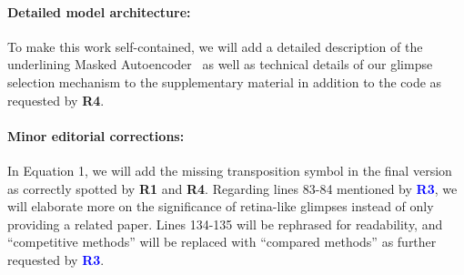 \documentclass{article}
\newcommand{\Rone}{{\textbf{\textcolor{JungleGreen}{R1}}}}
\newcommand{\Rthree}{{\textbf{\textcolor{Blue}{R3}}}}
\newcommand{\Rfour}{{\textbf{\textcolor{RedViolet}{R4}}}}
\begin{document}
\paragraph{Detailed model architecture:} To make this work self-contained, we will add a detailed description of the underlining Masked Autoencoder~\cite{he2022masked} as well as technical details of our glimpse selection mechanism to the supplementary material in addition to the code as requested by \Rfour{}.

\paragraph{Minor editorial corrections:} In Equation 1, we will add the missing transposition symbol in the final version as correctly spotted by \Rone{} and \Rfour{}. Regarding lines 83-84 mentioned by \Rthree{}, we will elaborate more on the significance of retina-like glimpses instead of only providing a related paper. Lines 134-135 will be rephrased for readability, and ``competitive methods'' will be replaced with ``compared methods'' as further requested by \Rthree{}.



\end{document}
